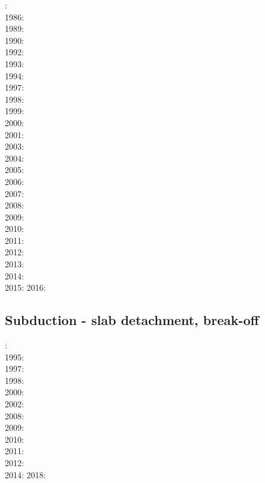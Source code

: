 : \cite{thar85}\\
1986: \cite{jarr86}\\
1989: \cite{boww89}\\
1990: \cite{hstt90}\\
1992: \cite{zhgu92}\cite{whbw92}\\
1993: \cite{jope93}\cite{dvnm93}\\
1994: \cite{zhgu94}\cite{wibe94}\cite{wdbo94a}\cite{wdbo94b}\\
1997: \cite{hajc97}\\
1998: \cite{itki98}\cite{buwg98}\cite{brmy98}\\
1999: \cite{hagu99}\cite{befo99}\\
2000: \cite{tesc00}\cite{brky00}\\
2001: \cite{bujl01}\\
2003: \cite{refm03}\\
2004: \cite{toba04}\cite{bocj04}\\
2005: \cite{jalo05}\cite{lahb05}\\
2006: \cite{degw06}\cite{rohu06}\\
2007: \cite{artd07}\cite{yaab07}\\
2008: \cite{yaba08}\cite{ozrs08}\cite{dihf08}\cite{wabj08}\cite{wabj08b}\cite{boht08b}\cite{boht08a}\cite{baso08}\\
2009: \cite{yahb09}\cite{bill09}\cite{fagb09}\\
2010: \cite{hagr10}\cite{lobh10}\\
2011: \cite{lixg11}\cite{list11}\cite{bubj11}\cite{bagw11b}\\
2012: \cite{anwb12}\cite{jahu12}\cite{jabi12}\cite{jabk12}\cite{lixg12}\cite{lixg13}\cite{ronb12}\cite{tebu12}\cite{thka12}\cite{bova12}\\
2013: \cite{nabg13}\cite{hage13}\cite{ancv13}\cite{namu13}\cite{yosh13}\cite{zhgt13}\cite{jabr13}\cite{izht13}\cite{luws13}\cite{dusc13}\cite{tibb13}\cite{bubj13}\cite{scmo13}\\
2014: \cite{robn14}\cite{hond14}\cite{ronc14}\\
2015: \cite{bemm15}\cite{bomv15}
2016: \cite{tomy16}

\subsection*{Subduction - slab detachment, break-off}

: \cite{wosp92}\\
1995: \cite{yowo95}\\
1997: \cite{wowo97}\\
1998: \cite{desw98}\\
2000: \cite{wosp00}\\
2002: \cite{bugw02}\\
2008: \cite{zlfd08}\\
2009: \cite{anbi09}\cite{bubi09}\\
2010: \cite{bubi10}\\
2011: \cite{dugm11}\\
2012: \cite{dugk12}\cite{dusg12}\\
2014: \cite{dugs14}\cite{besr14}
2018: \cite{garm18}

